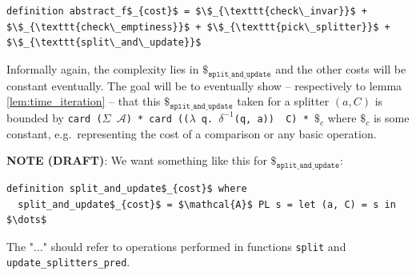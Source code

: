 \documentclass[12pt, a4 paper]{article}
\theoremstyle{definition}
\begin{document}
\begin{lstlisting}[language=Isabelle]
definition abstract_f$_{cost}$ = $\$_{\texttt{check\_invar}}$ + $\$_{\texttt{check\_emptiness}}$ + $\$_{\texttt{pick\_splitter}}$ + $\$_{\texttt{split\_and\_update}}$
\end{lstlisting}

Informally again, the complexity lies in $\$_{\texttt{split\_and\_update}}$ and the other costs will be constant eventually. The goal will be to eventually show -- respectively to lemma \ref{lem:time_iteration} -- that this $\$_{\texttt{split\_and\_update}}$ taken for a splitter $(a, C)$ is bounded by \texttt{card ($\Sigma$ $\mathcal{A}$) * card (($\lambda$ q. $\delta^{-1}$(q, a)) \textasciigrave\ C) * $\$_c$} where $\$_c$ is some constant, e.g.\ representing the cost of a comparison or any basic operation.

\vfill

{\bf NOTE (DRAFT)}: We want something like this for $\$_{\texttt{split\_and\_update}}$:
\begin{lstlisting}[language=Isabelle]
definition split_and_update$_{cost}$ where
  split_and_update$_{cost}$ = $\mathcal{A}$ PL s = let (a, C) = s in $\dots$
\end{lstlisting}
The "$\dots$" should refer to operations performed in functions \texttt{split} and \texttt{update\_splitters\_pred}.


% 

\pagebreak


\end{document}
